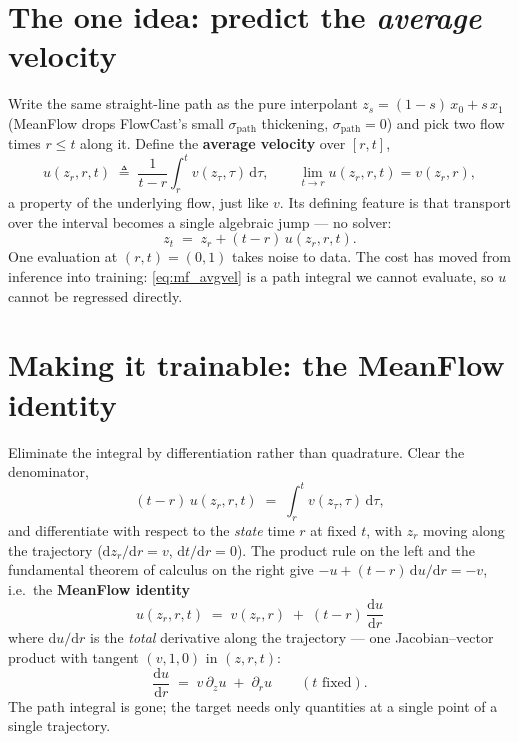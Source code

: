 \documentclass[11pt]{article}
\newcommand{\dd}{\mathrm{d}}
\begin{document}
\section{The one idea: predict the \emph{average} velocity}

Write the same straight-line path as the pure interpolant
$z_s=(1-s)\,x_0+s\,x_1$ (MeanFlow drops FlowCast's small $\sigma_{\mathrm{path}}$
thickening, $\sigma_{\mathrm{path}}=0$) and pick two flow times $r\le t$ along
it. Define the \textbf{average velocity} over $[r,t]$,
\begin{equation}
  u(z_r,r,t) \;\triangleq\; \frac{1}{t-r}\int_r^t v(z_\tau,\tau)\,\dd\tau,
  \qquad \lim_{t\to r} u(z_r,r,t) = v(z_r,r),
  \label{eq:mf_avgvel}
\end{equation}
a property of the underlying flow, just like $v$. Its defining feature is that
transport over the interval becomes a single algebraic jump --- no solver:
\begin{equation}
  z_t \;=\; z_r + (t-r)\,u(z_r,r,t).
  \label{eq:mf_displacement}
\end{equation}
One evaluation at $(r,t)=(0,1)$ takes noise to data. The cost has moved from
inference into training: \eqref{eq:mf_avgvel} is a path integral we cannot
evaluate, so $u$ cannot be regressed directly.

\section{Making it trainable: the MeanFlow identity}

Eliminate the integral by differentiation rather than quadrature. Clear the
denominator,
\begin{equation}
  (t-r)\,u(z_r,r,t) \;=\; \int_r^t v(z_\tau,\tau)\,\dd\tau,
  \label{eq:mf_integral}
\end{equation}
and differentiate with respect to the \emph{state} time $r$ at fixed $t$, with
$z_r$ moving along the trajectory ($\dd z_r/\dd r=v$, $\dd t/\dd r=0$). The
product rule on the left and the fundamental theorem of calculus on the right
give $-u+(t-r)\,\dd u/\dd r=-v$, i.e.\ the \textbf{MeanFlow identity}
\begin{equation}
  \boxed{\;\;u(z_r,r,t) \;=\; v(z_r,r) \;+\; (t-r)\,\frac{\dd u}{\dd r}\;\;}
  \label{eq:mf_identity}
\end{equation}
where $\dd u/\dd r$ is the \emph{total} derivative along the trajectory --- one
Jacobian--vector product with tangent $(v,1,0)$ in $(z,r,t)$:
\begin{equation}
  \frac{\dd u}{\dd r} \;=\; v\,\partial_z u \;+\; \partial_r u
  \qquad(\text{$t$ fixed}).
  \label{eq:mf_jvp}
\end{equation}
The path integral is gone; the target needs only quantities at a single point of
a single trajectory.
\end{document}
